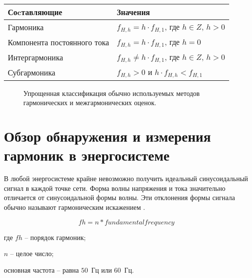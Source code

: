 \begin{table}[ht]
	\caption{Спектральные составляющие волны}%
	\label{tbl:test1_1}%
	\fontsize{14pt}{14pt}\selectfont
	\begin{longtable*}[c]{|l|l|} 
		\hline
		Соcтавляющие & Значения \\
		\hline
		Гармоника &
    	$f_{H,h}=h\cdot f_{H,1}$, где $h \in Z$, $h>0$
 \\
    	
    	Компонента постоянного тока &
    	$f_{H,h}=h\cdot f_{H,1}$, где $h = 0 $
 \\
    	
    	Интергармоника &
    	$f_{H,h}\neq h\cdot f_{H,1}$, где $h \in Z$, $h>0$  \\
    	
    	Субгармоника &
    	$f_{H,h} > 0$ и $h\cdot f_{H,h} < f_{H,1}$ \\
		\hline
	\end{longtable*}
\end{table}

\begin{figure}[ht]
	\caption{Упрощенная классификация обычно используемых методов гармонических и межгармонических оценок.}\label{fig:picture1.3}
\end{figure}

\section{Обзор обнаружения и измерения гармоник в энергосистеме} \label{sec:ch1/sec2}

В любой энергосистеме крайне невозможно получить идеальный синусоидальный сигнал в каждой точке сети. Форма волны напряжения и тока значительно отличается от синусоидальной формы волны. Эти отклонения формы сигнала обычно называют гармоническим искажением \cite{durdhavale2016review}.

\begin{equation}
	\label{eq:equation1.11}
	fh = n * fundamental frequency
\end{equation} 

где $fh$ – порядок гармоник;

$n$ – целое число;

основная частота – равна $50$~Гц или $60$~Гц.

